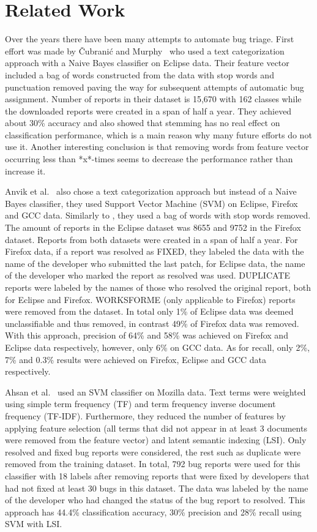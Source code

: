 \chapter{Related Work}

Over the years there have been many attempts to automate bug triage. First effort was made by Čubranić and Murphy~\cite{Murphy} who used a text categorization approach with a Naive Bayes classifier on Eclipse data. Their feature vector included a bag of words constructed from the data with stop words and punctuation removed paving the way for subsequent attempts of automatic bug assignment. Number of reports in their dataset is 15,670 with 162 classes while the downloaded reports were created in a span of half a year. They achieved about 30\% accuracy and also showed that stemming has no real effect on classification performance, which is a main reason why many future efforts do not use it. Another interesting conclusion is that removing words from feature vector occurring less than *x*-times seems to decrease the performance rather than increase it.

Anvik et al.~\cite{Anvik2006} also chose a text categorization approach but instead of a Naive Bayes classifier, they used Support Vector Machine (SVM) on Eclipse, Firefox and GCC data. Similarly to \cite{Murphy}, they used a bag of words with stop words removed. The amount of reports in the Eclipse dataset was 8655 and 9752 in the Firefox dataset. Reports from both datasets were created in a span of half a year. For Firefox data, if a report was resolved as FIXED, they labeled the data with the name of the developer who submitted the last patch, for Eclipse data, the name of the developer who marked the report as resolved was used. DUPLICATE reports were labeled by the names of those who resolved the original report, both for Eclipse and Firefox. WORKSFORME (only applicable to Firefox) reports were removed from the dataset. In total only 1\% of Eclipse data was deemed unclassifiable and thus removed, in contrast 49\% of Firefox data was removed. With this approach, precision of 64\% and 58\% was achieved on Firefox and Eclipse data respectively, however, only 6\% on GCC data. As for recall, only 2\%, 7\% and 0.3\% results were achieved on Firefox, Eclipse and GCC data respectively.

Ahsan et al.~\cite{Ahsan2009} used an SVM classifier on Mozilla data. Text terms were weighted using simple term frequency (TF) and term frequency inverse document frequency (TF-IDF). Furthermore, they reduced the number of features by applying feature selection (all terms that did not appear in at least 3 documents were removed from the feature vector) and latent semantic indexing (LSI). Only resolved and fixed bug reports were considered, the rest such as duplicate were removed from the training dataset. In total, 792 bug reports were used for this classifier with 18 labels after removing reports that were fixed by developers that had not fixed at least 30 bugs in this dataset. The data was labeled by the name of the developer who had changed the status of the bug report to resolved. This approach has 44.4\% classification accuracy, 30\% precision and 28\% recall using SVM with LSI.

